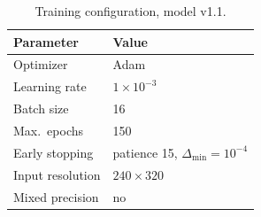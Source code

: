 \begin{table}[t]
\centering
\caption{Training configuration, model v1.1.}
\label{tab:train11}
\begin{tabular}{@{}ll@{}}
\toprule
\textbf{Parameter} & \textbf{Value} \\
\midrule
Optimizer & Adam \\
Learning rate & $1\times10^{-3}$ \\
Batch size & 16 \\
Max.\ epochs & 150 \\
Early stopping & patience 15, $\Delta_{\mathrm{min}}=10^{-4}$ \\
Input resolution & $240\times320$ \\
Mixed precision & no \\
\bottomrule
\end{tabular}
\end{table}
